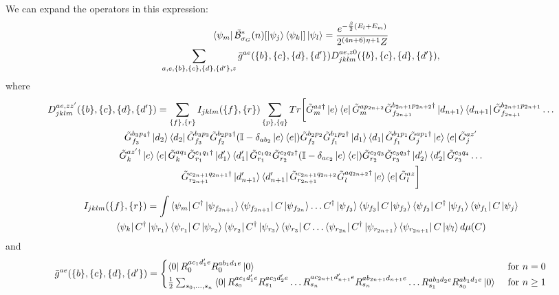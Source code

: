 \documentclass[aps,floatfix,10pt,amssymb,amsfont,amsmath,superscriptaddress,float,nofootinbib,longbibliography,nobalancelastpage,twocolumn]{revtex4-2}
\begin{document}
We can expand the operators in this expression:
\begin{multline}
    \bra{\psi_m}\tilde{\mathcal{B}}^*_{\sigma_G}(n)[\ket{\psi_j}\bra{\psi_k}]\ket{\psi_l} = \frac{e^{-\frac{\beta}{2}(E_l+E_m)}}{2^{(4n+6)\eta+1}Z}\\\sum_{a,e,\{b\},\{c\},\{d\},\{d'\},z} \bar g^{ae}(\{b\},\{c\},\{d\},\{d'\}) D^{ae,z0}_{jklm}(\{b\},\{c\},\{d\},\{d'\}),
    \label{eq:B*def}
\end{multline}
where 
\begin{multline}
    D^{ae,zz'}_{jklm}(\{b\},\{c\},\{d\},\{d'\}) =  \sum_{\{f\}, \{r\}}  I_{jklm}(\{f\},\{r\})
    \sum_{\{p\},\{q\}}
Tr\bigg[\tilde G^{az\dagger}_m\ket{e}\bra{e}\tilde G^{ap_{2n+2}}_m\tilde G^{b_{2n+1}p_{2n+2}\dagger}_{f_{2n+1}}\ket{d_{n+1}}\bra{d_{n+1}}\tilde G^{b_{2n+1}p_{2n+1}}_{f_{2n+1}}\ldots\\ \tilde G^{b_3p_4\dagger}_{f_3}\ket{d_2}\bra{d_2}\tilde G^{b_3p_3}_{f_3}\tilde G^{b_2p_3\dagger}_{f_2}(\mathbb{I} - \delta_{ab_2}\ket{e}\bra{e})\tilde G^{b_2p_2}_{f_2}\tilde G^{b_1p_2\dagger}_{f_1}\ket{d_1}\bra{d_1}\tilde G^{b_1p_1}_{f_1}\tilde G^{ap_1\dagger}_j\ket{e}\bra{e}\tilde G^{az'}_j\\
\tilde G^{az'\dagger}_k\ket{e}\bra{e}\tilde G^{aq_1}_k\tilde G^{c_1q_1\dagger}_{r_1}\ket{d'_1}\bra{d'_1}\tilde G^{c_1q_2}_{r_1}\tilde G^{c_2q_2\dagger}_{r_2}(\mathbb{I} - \delta_{ac_2}\ket{e}\bra{e})\tilde G^{c_2q_3}_{r_2}\tilde G^{c_3q_3\dagger}_{r_3}\ket{d'_2}\bra{d'_2}\tilde G^{c_3q_4}_{r_3}\ldots\\
\tilde G^{c_{2n+1}q_{2n+1}\dagger}_{r_{2n+1}}\ket{d'_{n+1}}\bra{d'_{n+1}}\tilde G^{c_{2n+1}q_{2n+2}}_{r_{2n+1}}\tilde G^{aq_{2n+2}\dagger}_l\ket{e}\bra{e}\tilde G^{az}_l \bigg]
\end{multline}
\begin{multline}
I_{jklm}(\{f\},\{r\})=\int\bra{\psi_{m}}C^{\dagger}\ket{\psi_{f_{2n+1}}}\bra{\psi_{f_{2n+1}}}C\ket{\psi_{f_{2n}}}\ldots C^{\dagger}\ket{\psi_{f_3}}\bra{\psi_{f_3}}C\ket{\psi_{f_2}}\bra{\psi_{f_2}}C^{\dagger}\ket{\psi_{f_1}}\bra{\psi_{f_1}}C\ket{\psi_j}
\\\bra{\psi_k}C^{\dagger}\ket{\psi_{r_1}}\bra{\psi_{r_1}}C\ket{\psi_{r_2}}\bra{\psi_{r_2}}C^{\dagger}\ket{\psi_{r_3}}\bra{\psi_{r_3}}C\ldots \bra{\psi_{r_{2n}}}C^{\dagger}\ket{\psi_{r_{2n+1}}}\bra{\psi_{r_{2n+1}}}C\ket{\psi_{l}}d\mu(C)
\end{multline}
and
\begin{equation}
       \bar g^{ae}(\{b\},\{c\},\{d\},\{d'\}) = \begin{cases} \bra{0}R_{0}^{ac_1d'_1e}R_{0}^{ab_1d_1e}\ket{0}& \text{ for } n = 0\\
       \frac12\sum_{s_0,\ldots,s_n}
       \bra{0}R_{s_0}^{ac_1d'_1e}R_{s_1}^{ac_3d'_2e}\ldots
       R_{s_n}^{ac_{2n+1}d'_{n+1}e} R_{s_n}^{ab_{2n+1}d_{n+1}e}\ldots
       R_{s_1}^{ab_3d_2e}R_{s_0}^{ab_1d_1e}\ket{0} & \text{ for } n \geq 1
       \end{cases}
       \label{eq:gbar-definition}
\end{equation}
\end{document}
